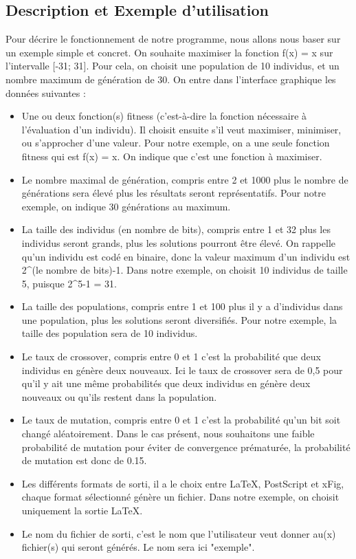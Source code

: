 \documentclass[a4paper,11pt]{article}
\begin{document}
		\subsection{Description et Exemple d’utilisation}
			Pour décrire le fonctionnement de notre programme, nous allons nous baser sur un exemple simple et concret.
			On souhaite maximiser la fonction f(x) = x sur l'intervalle [-31; 31].
			Pour cela, on choisit une population de 10 individus, et un nombre maximum de génération de 30.
			On entre dans l’interface graphique les données suivantes :\\
				\begin{itemize}
					\item	Une ou deux fonction(s) fitness (c’est-à-dire la fonction nécessaire à l’évaluation d’un individu). 
							Il choisit ensuite s’il veut maximiser, minimiser, ou s’approcher d’une valeur. 
							Pour notre exemple, on a une seule fonction fitness qui est f(x) = x. On indique que c’est une fonction à maximiser.
					\item 	Le nombre maximal de génération, compris entre 2 et 1000 plus le nombre de générations sera élevé plus les résultats seront représentatifs. 
							Pour notre exemple, on indique 30 générations au maximum.		
					\item	La taille des individus (en nombre de bits), compris entre 1 et 32 plus les individus seront grands, plus les solutions pourront être élevé.
							On rappelle qu’un individu est codé en binaire, donc la valeur maximum d’un individu est 2\^{}(le nombre de bits)-1.
							Dans notre exemple, on choisit 10 individus de taille 5, puisque 2\^{}5-1 = 31. 
					\item	La taille des populations, compris entre 1 et 100 plus il y a d'individus dans une population, plus les solutions seront diversifiés.
							Pour notre exemple, la taille des population sera de 10 individus.
					\item	Le taux de crossover, compris entre 0 et 1 c'est la probabilité que deux individus en génère deux nouveaux.
							Ici le taux de crossover sera de 0,5 pour qu'il y ait une même probabilités que deux individus en génère deux nouveaux ou qu'ils restent dans la population.
					\item	Le taux de mutation, compris entre 0 et 1 c'est la probabilité qu'un bit soit changé aléatoirement.
							Dans le cas présent, nous souhaitons une faible probabilité de mutation pour éviter de convergence prématurée, la probabilité de mutation est donc de 0.15.
					\item	Les différents formats de sorti, il a le choix entre LaTeX, PostScript et xFig, chaque format sélectionné génère un fichier.
							Dans notre exemple, on choisit uniquement la sortie LaTeX.
					\item	Le nom du fichier de sorti, c'est le nom que l'utilisateur veut donner au(x) fichier(s) qui seront générés.
							Le nom sera ici "exemple".\\
					\end{itemize}
\end{document}
